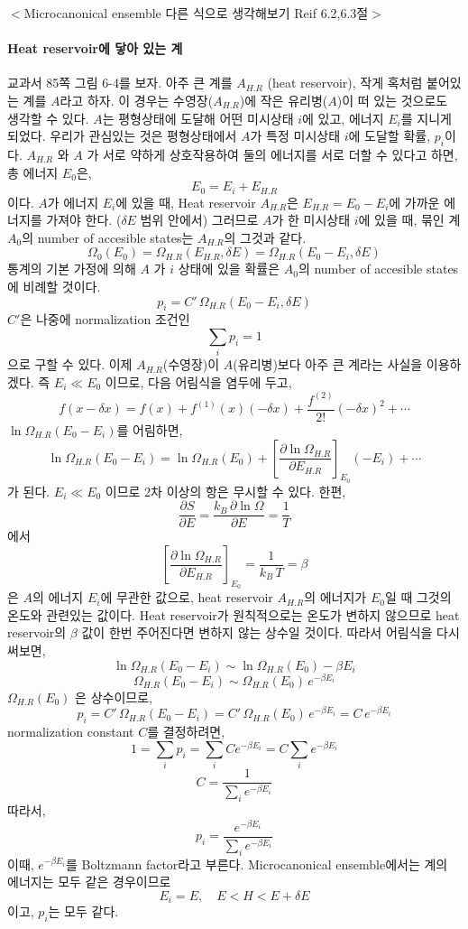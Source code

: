 \documentclass[a4paper,12pt]{article}
\begin{document}
	\begin{flushleft}
		$<$Microcanonical ensemble 다른 식으로 생각해보기 Reif 6.2,6.3절$>$ 
	\end{flushleft}
\paragraph{Heat reservoir에 닿아 있는 계}
교과서 85쪽 그림 6-4를 보자. 아주 큰 계를 $A_{H.R}$ (heat reservoir), 작게 혹처럼 붙어있는 계를 $A$라고 하자. 이 경우는 수영장($A_{H.R}$)에 작은 유리병($A$)이 떠 있는 것으로도 생각할 수 있다. 
$A$는 평형상태에 도달해 어떤 미시상태 $i$에 있고, 에너지 $E_i$를 지니게되었다. 우리가 관심있는 것은 평형상태에서 $A$가 특정 미시상태 $i$에 도달할 확률, $p_i$이다. $A_{H.R}$ 와 $A$ 가 서로 약하게 상호작용하여 둘의 에너지를 서로 더할 수 있다고 하면, 총 에너지 $E_0$은,
$$E_0=E_i+E_{H.R}$$
이다. $A$가 에너지 $E_i$에 있을 때, Heat reservoir $A_{H.R}$은 $E_{H.R}=E_0-E_i$에 가까운 에너지를 가져야 한다. ($\delta E$ 범위 안에서) 그러므로 $A$가 한 미시상태 $i$에 있을 때, 묶인 계 $A_0$의 number of accesible states는 $A_{H.R}$의 그것과 같다.
$$\Omega_0(E_0)=\Omega_{H.R}(E_{H.R},\delta E)=\Omega_{H.R}(E_0-E_i,\delta E)$$ 
통계의 기본 가정에 의해 $A$ 가 $i$ 상태에 있을 확률은 $A_0$의 number of accesible states에 비례할 것이다.
$$p_i=C'\,\Omega_{H.R}(E_0-E_i,\delta E)$$
$C'$은 나중에 normalization 조건인
$$\sum_{i}p_i=1$$
으로 구할 수 있다.
이제 $A_{H.R}$(수영장)이 $A$(유리병)보다 아주 큰 계라는 사실을 이용하겠다. 즉 $E_i \ll E_0$ 이므로, 다음 어림식을 염두에 두고,
$$f(x-\delta x)=f(x)+f^{(1)}(x)(-\delta x)+\frac{f^{(2)}}{2!}(-\delta x)^2+\cdots$$
$\ln\Omega_{H.R}(E_0-E_i)$를 어림하면,
$$\ln \Omega_{H.R}(E_0-E_i)=\ln \Omega_{H.R}(E_0)+\left[ \frac{\partial \ln \Omega_{H.R}}{\partial E_{H.R}}\right]_{E_0} (-E_i)+\cdots$$
가 된다. $E_i\ll E_0$ 이므로 2차 이상의 항은 무시할 수 있다. 한편,
$$\frac{\partial S}{\partial E}=\frac{k_B\,\partial \ln \Omega}{\partial E}=\frac{1}{T}$$ 에서
$$\left[ \frac{\partial \ln \Omega_{H.R}}{\partial E_{H.R}}\right]_{E_0}=\frac{1}{k_B\,T}=\beta $$은 $A$의 에너지 $E_i$에 무관한 값으로, heat reservoir $A_{H.R}$의 에너지가 $E_0$일 때 그것의 온도와 관련있는 값이다. Heat reservoir가 원칙적으로는 온도가 변하지 않으므로 heat reservoir의 $\beta$ 값이 한번 주어진다면 변하지 않는 상수일 것이다. 따라서 어림식을 다시 써보면, 
$$\ln \Omega_{H.R}(E_0-E_i)\sim\ln \Omega_{H.R}(E_0)-\beta E_i$$
$$\Omega_{H.R}(E_0-E_i)\sim\Omega_{H.R}(E_0)\,e^{-\beta E_i}$$
$\Omega_{H.R}(E_0)$ 은 상수이므로, 
$$p_i=C'\,\Omega_{H.R}(E_0-E_i)=C'\,\Omega_{H.R}(E_0)\,e^{-\beta E_i}=C\,e^{-\beta E_i}$$
normalization constant $C$를 결정하려면, 
$$1=\sum_{i}p_i=\sum_{i}Ce^{-\beta E_i}=C\sum_{i}e^{-\beta E_i}$$
$$C=\frac{1}{\sum_{i}e^{-\beta E_i}}$$
따라서,
$$p_i=\frac{e^{-\beta E_i}}{\sum_{i}e^{-\beta E_i}}$$
이때, $e^{-\beta E_i}$를 Boltzmann factor라고 부른다. 
Microcanonical ensemble에서는 계의 에너지는 모두 같은 경우이므로 $$E_i=E,\quad E<H<E+\delta E$$이고, $p_i$는 모두 같다. 
\end{document}
